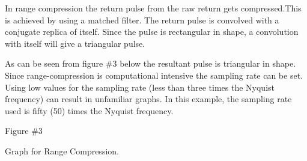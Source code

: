 \documentclass{sebase}
\begin{document}
In range compression the return pulse from the raw return gets
compressed.\smallskip This is achieved by using a matched filter. The return
pulse is convolved with a conjugate replica of itself. Since the pulse is
rectangular in shape, a convolution with itself will give a triangular pulse.

As can be seen from figure \#3 below the resultant pulse is triangular in
shape. Since range-compression is computational intensive the sampling rate
can be set. Using low values for the sampling rate (less than three times
the Nyquist frequency) can result in unfamiliar graphs. In this example, the
sampling rate used is fifty (50) times the Nyquist frequency.

\smallskip

\smallskip

Figure \#3

\smallskip

\smallskip Graph for Range Compression.

\smallskip

\smallskip

\smallskip

\smallskip

\smallskip
\end{document}

